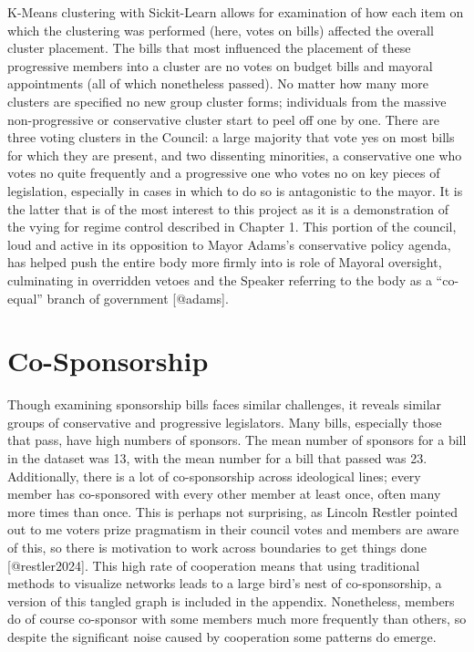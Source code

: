 \documentclass[
  letterpaper,
  DIV=11,
  numbers=noendperiod]{scrartcl}
\begin{document}
K-Means clustering with Sickit-Learn allows for examination of how each
item on which the clustering was performed (here, votes on bills)
affected the overall cluster placement. The bills that most influenced
the placement of these progressive members into a cluster are no votes
on budget bills and mayoral appointments (all of which nonetheless
passed). No matter how many more clusters are specified no new group
cluster forms; individuals from the massive non-progressive or
conservative cluster start to peel off one by one. There are three
voting clusters in the Council: a large majority that vote yes on most
bills for which they are present, and two dissenting minorities, a
conservative one who votes no quite frequently and a progressive one who
votes no on key pieces of legislation, especially in cases in which to
do so is antagonistic to the mayor. It is the latter that is of the most
interest to this project as it is a demonstration of the vying for
regime control described in Chapter 1. This portion of the council, loud
and active in its opposition to Mayor Adams's conservative policy
agenda, has helped push the entire body more firmly into is role of
Mayoral oversight, culminating in overridden vetoes and the Speaker
referring to the body as a ``co-equal'' branch of government
{[}@adams{]}.

\hypertarget{co-sponsorship}{%
\section{Co-Sponsorship}\label{co-sponsorship}}

Though examining sponsorship bills faces similar challenges, it reveals
similar groups of conservative and progressive legislators. Many bills,
especially those that pass, have high numbers of sponsors. The mean
number of sponsors for a bill in the dataset was 13, with the mean
number for a bill that passed was 23. Additionally, there is a lot of
co-sponsorship across ideological lines; every member has co-sponsored
with every other member at least once, often many more times than once.
This is perhaps not surprising, as Lincoln Restler pointed out to me
voters prize pragmatism in their council votes and members are aware of
this, so there is motivation to work across boundaries to get things
done {[}@restler2024{]}. This high rate of cooperation means that using
traditional methods to visualize networks leads to a large bird's nest
of co-sponsorship, a version of this tangled graph is included in the
appendix. Nonetheless, members do of course co-sponsor with some members
much more frequently than others, so despite the significant noise
caused by cooperation some patterns do emerge.
\end{document}
